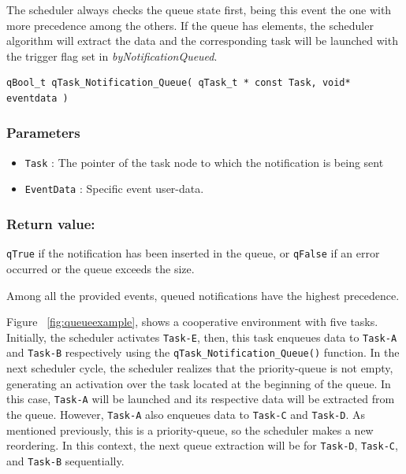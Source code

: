 \documentclass{article}
\begin{document}


The scheduler always checks the queue state first, being this event the one with more precedence among the others. If the queue has elements, the scheduler algorithm will extract the data and the corresponding task will be launched with the trigger flag set in \textit{byNotificationQueued}. \\

\begin{lstlisting}[style=CStyle]
qBool_t qTask_Notification_Queue( qTask_t * const Task, void* eventdata )
\end{lstlisting}

\subsubsection*{Parameters}
\begin{itemize}
    \item \lstinline{Task} : The pointer of the task node to which the notification is being sent 
    \item \lstinline{EventData} : Specific event user-data. 
\end{itemize}

\subsubsection*{Return value:}

\lstinline{qTrue} if the notification  has been inserted in the queue, or \lstinline{qFalse} if an error occurred or the queue exceeds the size. \\

\begin{tcolorbox}
\HandRight Among all the provided events, queued notifications have the highest precedence.
\end{tcolorbox}


Figure ~\ref{fig:queueexample}, shows a cooperative environment with five tasks. Initially, the scheduler activates \lstinline{Task-E}, then, this task enqueues data to \lstinline{Task-A} and \lstinline{Task-B} respectively using the \lstinline{qTask_Notification_Queue()} function. In the next scheduler cycle, the scheduler realizes that the priority-queue is not empty, generating an activation over the task located at the beginning of the queue. In this case, \lstinline{Task-A} will be launched and its respective data will be extracted from the queue. However, \lstinline{Task-A} also enqueues data to \lstinline{Task-C} and \lstinline{Task-D}. As mentioned previously, this is a priority-queue, so the scheduler makes a new reordering. In this context, the next queue extraction will be for \lstinline{Task-D}, \lstinline{Task-C}, and \lstinline{Task-B} sequentially.
\end{document}
